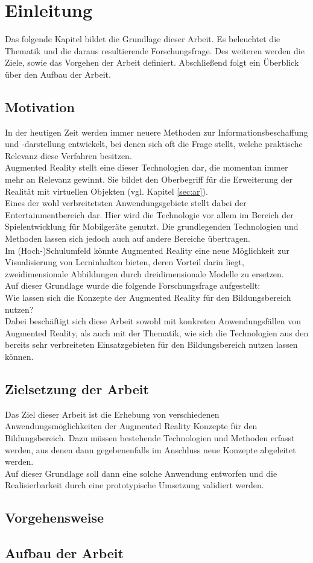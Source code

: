 \chapter{Einleitung}\label{chapter:einleitung}
Das folgende Kapitel bildet die Grundlage dieser Arbeit. Es beleuchtet die Thematik und die daraus resultierende Forschungsfrage. Des weiteren werden die Ziele, sowie das Vorgehen der Arbeit definiert. Abschließend folgt ein Überblick über den Aufbau der Arbeit.

\section{Motivation}\label{sec:motivation}
In der heutigen Zeit werden immer neuere Methoden zur Informationsbeschaffung und -darstellung entwickelt, bei denen sich oft die Frage stellt, welche praktische Relevanz diese Verfahren besitzen. \\
Augmented Reality stellt eine dieser Technologien dar, die momentan immer mehr an Relevanz gewinnt. Sie bildet den Oberbegriff für die Erweiterung der Realität mit virtuellen Objekten (vgl. Kapitel \ref{sec:ar}). \\
Eines der wohl verbreitetsten Anwendungsgebiete stellt dabei der Entertainmentbereich dar. Hier wird die Technologie vor allem im Bereich der Spielentwicklung für Mobilgeräte genutzt. Die grundlegenden Technologien und Methoden lassen sich jedoch auch auf andere Bereiche übertragen. \\
Im (Hoch-)Schulumfeld könnte Augmented Reality eine neue Möglichkeit zur Visualisierung von Lerninhalten bieten, deren Vorteil darin liegt, zweidimensionale Abbildungen durch dreidimensionale Modelle zu ersetzen. \\
Auf dieser Grundlage wurde die folgende Forschungsfrage aufgestellt:\\
\glqq Wie lassen sich die Konzepte der Augmented Reality für den Bildungsbereich nutzen?\grqq \\
Dabei beschäftigt sich diese Arbeit sowohl mit konkreten Anwendungsfällen von Augmented Reality, als auch mit der Thematik, wie sich die Technologien aus den bereits sehr verbreiteten Einsatzgebieten für den Bildungsbereich nutzen lassen können. \\


\section{Zielsetzung der Arbeit}\label{sec:ziele}
Das Ziel dieser Arbeit ist die Erhebung von verschiedenen Anwendungsmöglichkeiten der Augmented Reality Konzepte für den Bildungsbereich. Dazu müssen bestehende Technologien und Methoden erfasst werden, aus denen dann gegebenenfalls im Anschluss neue Konzepte abgeleitet werden. \\
Auf dieser Grundlage soll dann eine solche Anwendung entworfen und die Realisierbarkeit durch eine prototypische Umsetzung validiert werden.

\section{Vorgehensweise}

\section{Aufbau der Arbeit}
